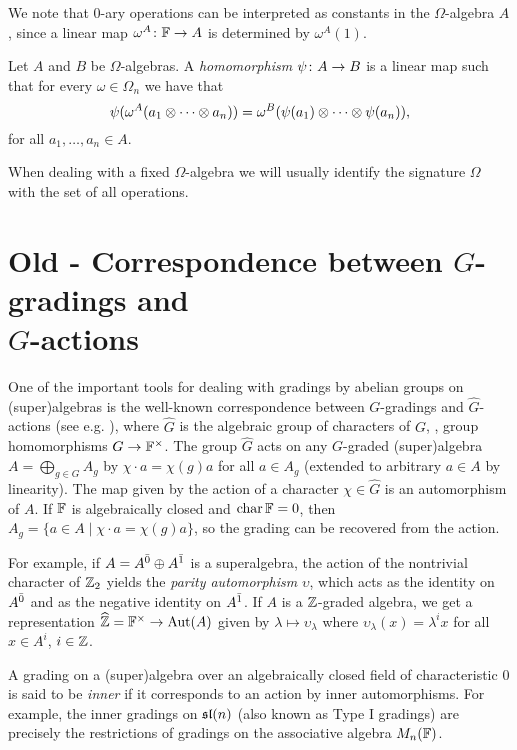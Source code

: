 We note that $0$-ary operations can be interpreted as constants in the $\Omega$-algebra $A$, since a linear map $\omega^A\colon \mathbb{F} \to A$ is determined by $\omega^A(1)$.

\begin{defi}
    Let $A$ and $B$ be $\Omega$-algebras. 
    A \emph{homomorphism} $\psi\colon A \to B$ is a linear map such that for every $\omega \in \Omega_n$ we have that
    \[
        \psi( \omega^A (a_1 \otimes \cdots \otimes a_n) ) = \omega^B ( \psi(a_1) \otimes \cdots \otimes \psi(a_n) ),
    \]
    for all $a_1, \ldots, a_n \in A$.
\end{defi}

When dealing with a fixed $\Omega$-algebra we will usually identify the signature $\Omega$ with the set of all operations.



\section{Old - Correspondence between $G$-gradings and\\ $\widehat G$-actions}\label{ssec:G-hat-action}

One of the important tools for dealing with gradings by abelian groups on (super)algebras is the well-known correspondence between  $G$-gradings and $\widehat G$-actions (see e.g. \cite[\S 1.4]{livromicha}), where $\widehat G$ is the algebraic group of characters of $G$, \ie, group homomorphisms $G \rightarrow \mathbb{F}^{\times}$. The group $\widehat{G}$ acts on any $G$-graded (super)algebra $A = \bigoplus_{g\in G} A_g$ by $\chi \cdot a = \chi(g) a$ for all $a\in A_g$ (extended to arbitrary $a\in A$ by linearity). The map given by the action of a character $\chi \in \widehat{G}$ is an automorphism of $A$. If $\mathbb{F}$ is algebraically closed and $\operatorname{char} \mathbb{F} = 0$, then $A_g = \{ a\in A \mid \chi \cdot a = \chi (g) a\}$, so the grading can be recovered from the action.

For example, if $A=A^{\bar0} \oplus A^{\bar1}$ is a superalgebra, the action of the nontrivial character of $\mathbb{Z}_2$ yields the \emph{parity automorphism} $\upsilon$, which acts as the identity on $A^{\bar0}$ and as the negative identity on $A^{\bar1}$. If $A$ is a $\mathbb{Z}$-graded algebra, we get a representation $\widehat {\mathbb{Z}} = \mathbb{F}^\times \rightarrow \operatorname{Aut} (A)$ given by $\lambda \mapsto \upsilon_\lambda$ where $\upsilon_{\lambda} (x) = \lambda^i x$ for all $x\in A^i$, $i\in \mathbb{Z}$.

A grading on a (super)algebra over an algebraically closed field of characteristic $0$ is said to be \emph{inner} if it corresponds to an action by inner automorphisms. For example, the inner gradings on $\mathfrak{sl}(n)$ (also known as Type I gradings) are precisely the restrictions of gradings on the associative algebra $M_n(\mathbb{F})$.
